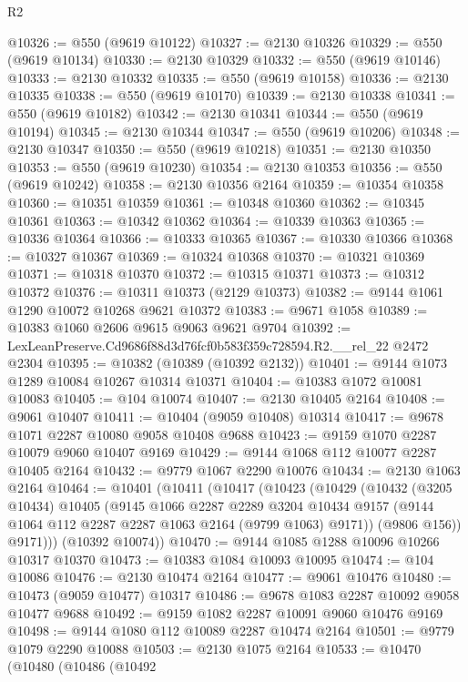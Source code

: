 \begin{lexlean}{R2}
\begin{coremodule}
@10326 := @550 (@9619 @10122)
@10327 := @2130 @10326
@10329 := @550 (@9619 @10134)
@10330 := @2130 @10329
@10332 := @550 (@9619 @10146)
@10333 := @2130 @10332
@10335 := @550 (@9619 @10158)
@10336 := @2130 @10335
@10338 := @550 (@9619 @10170)
@10339 := @2130 @10338
@10341 := @550 (@9619 @10182)
@10342 := @2130 @10341
@10344 := @550 (@9619 @10194)
@10345 := @2130 @10344
@10347 := @550 (@9619 @10206)
@10348 := @2130 @10347
@10350 := @550 (@9619 @10218)
@10351 := @2130 @10350
@10353 := @550 (@9619 @10230)
@10354 := @2130 @10353
@10356 := @550 (@9619 @10242)
@10358 := @2130 @10356 @2164
@10359 := @10354 @10358
@10360 := @10351 @10359
@10361 := @10348 @10360
@10362 := @10345 @10361
@10363 := @10342 @10362
@10364 := @10339 @10363
@10365 := @10336 @10364
@10366 := @10333 @10365
@10367 := @10330 @10366
@10368 := @10327 @10367
@10369 := @10324 @10368
@10370 := @10321 @10369
@10371 := @10318 @10370
@10372 := @10315 @10371
@10373 := @10312 @10372
@10376 := @10311 @10373 (@2129 @10373)
@10382 := @9144 @1061 @1290 @10072 @10268 @9621 @10372
@10383 := @9671 @1058
@10389 := @10383 @1060 @2606 @9615 @9063 @9621 @9704
@10392 := LexLeanPreserve.Cd9686f88d3d76fcf0b583f359c728594.R2.__rel_22 @2472 @2304
@10395 := @10382 (@10389 (@10392 @2132))
@10401 := @9144 @1073 @1289 @10084 @10267 @10314 @10371
@10404 := @10383 @1072 @10081 @10083
@10405 := @104 @10074
@10407 := @2130 @10405 @2164
@10408 := @9061 @10407
@10411 := @10404 (@9059 @10408) @10314
@10417 := @9678 @1071 @2287 @10080 @9058 @10408 @9688
@10423 := @9159 @1070 @2287 @10079 @9060 @10407 @9169
@10429 := @9144 @1068 @112 @10077 @2287 @10405 @2164
@10432 := @9779 @1067 @2290 @10076
@10434 := @2130 @1063 @2164
@10464 := @10401
    (@10411
      (@10417
        (@10423
          (@10429
            (@10432
              (@3205 @10434)
              @10405
              (@9145
                @1066
                @2287
                @2289
                @3204
                @10434
                @9157
                (@9144 @1064 @112 @2287 @2287 @1063 @2164 (@9799 @1063) @9171))
              (@9806 @156))
            @9171)))
      (@10392 @10074))
@10470 := @9144 @1085 @1288 @10096 @10266 @10317 @10370
@10473 := @10383 @1084 @10093 @10095
@10474 := @104 @10086
@10476 := @2130 @10474 @2164
@10477 := @9061 @10476
@10480 := @10473 (@9059 @10477) @10317
@10486 := @9678 @1083 @2287 @10092 @9058 @10477 @9688
@10492 := @9159 @1082 @2287 @10091 @9060 @10476 @9169
@10498 := @9144 @1080 @112 @10089 @2287 @10474 @2164
@10501 := @9779 @1079 @2290 @10088
@10503 := @2130 @1075 @2164
@10533 := @10470
    (@10480
      (@10486
        (@10492

\end{coremodule}
\end{lexlean}
